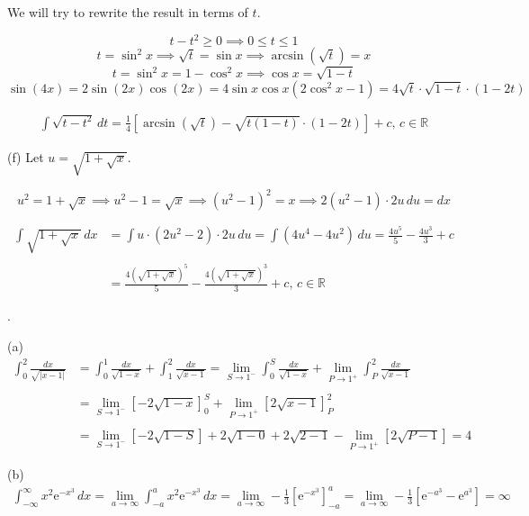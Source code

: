 \documentclass{article}
\begin{document}
\hfill

\noindent We will try to rewrite the result in terms of $t$.

\[t-t^2 \geq 0\implies 0\leq t \leq 1\]
\[t=\sin^2x \implies\sqrt t = \sin x\implies\arcsin\left(\sqrt t\right) = x\]
\[t=\sin^2x=1-\cos^2x\implies \cos x= \sqrt{1-t}\]
\[\sin(4x)=2\sin(2x)\cos(2x)=4\sin x\cos x\left(2\cos^2x-1\right)=4\sqrt t\cdot\sqrt{1-t}\cdot(1-2t)\]

\begin{align*}
\int\sqrt{t-t^2}\,dt=\boxed{\frac14\left[\arcsin\left(\sqrt t\right)-\sqrt{t(1-t)}\cdot(1-2t)\right]+c,\,c\in\mathbb{R}}
\end{align*}

\hfill

\noindent (f) Let $u=\sqrt{1+\sqrt x}$.

\[u^2 = 1+\sqrt x\implies u^2-1 = \sqrt x\implies\left(u^2-1\right)^2 = x\implies2\left(u^2-1\right)\cdot 2u\,du = dx\]

\begin{align*}
\int \sqrt{1+\sqrt{x}}\,dx&=\int u \cdot(2u^2-2)\cdot 2u\,du=\int\left(4u^4-4u^2\right)\,du=\frac{4u^5}5-\frac{4u^3}{3} + c\\\\&=\boxed{\frac{4\left(\sqrt{1+\sqrt x}\right)^5}5-\frac{4\left(\sqrt{1+\sqrt x}\right)^3}3+c,\,c\in\mathbb{R}}\end{align*}

\hfill

.

\hfill

\noindent (a)
\begin{align*}
\int_0^2\frac{dx}{\sqrt{|x-1|}}&=\int_0^1\frac{dx}{\sqrt{1-x}} + \int_1^2\frac{dx}{\sqrt{x-1}}=\lim_{S\to1^-}\int_0^S\frac{dx}{\sqrt{1-x}}+\lim_{P\to1^+}\int_P^2\frac{dx}{\sqrt{x-1}}\\\\&=\lim_{S\to1^-}\left[-2\sqrt{1-x}\right]_0^S+\lim_{P\to1^+}\left[2\sqrt{x-1}\right]_P^2\\\\&=\lim_{S\to1^-}\left[-2\sqrt{1-S}\right]+2\sqrt{1-0}+2\sqrt{2-1}-\lim_{P\to1^+}\left[2\sqrt{P-1}\right]=\boxed4
\end{align*}

\hfill

\noindent (b)
\begin{align*}\int_{-\infty}^{\infty} x^2\mathrm{e}^{-x^{3}}\,dx=\lim_{a\to\infty}\int_{-a}^{a} x^2\mathrm{e}^{-x^{3}}\,dx=\lim_{a\to\infty}-\frac13\left[\mathrm{e}^{-x^3}\right]_{-a}^a=\lim_{a\to\infty}-\frac13\left[\mathrm{e}^{-a^3}-\mathrm{e}^{a^3}\right]=\boxed\infty\end{align*}
\end{document}
